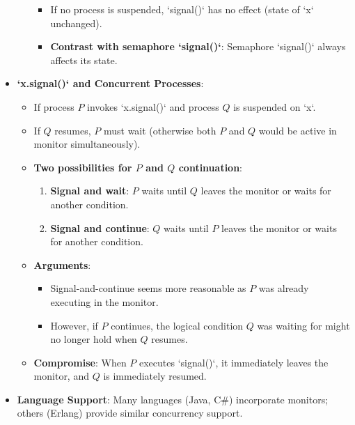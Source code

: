 \begin{itemize}
\begin{itemize}
\begin{itemize}
            \item If no process is suspended, `signal()` has no effect (state of `x` unchanged).
            \item \textbf{Contrast with semaphore `signal()`}: Semaphore `signal()` always affects its state.
        \end{itemize}
    \end{itemize}
    \item \textbf{`x.signal()` and Concurrent Processes}:
    \begin{itemize}
        \item If process $P$ invokes `x.signal()` and process $Q$ is suspended on `x`.
        \item If $Q$ resumes, $P$ must wait (otherwise both $P$ and $Q$ would be active in monitor simultaneously).
        \item \textbf{Two possibilities for $P$ and $Q$ continuation}:
        \begin{enumerate}
            \item \textbf{Signal and wait}: $P$ waits until $Q$ leaves the monitor or waits for another condition.
            \item \textbf{Signal and continue}: $Q$ waits until $P$ leaves the monitor or waits for another condition.
        \end{enumerate}
        \item \textbf{Arguments}:
        \begin{itemize}
            \item Signal-and-continue seems more reasonable as $P$ was already executing in the monitor.
            \item However, if $P$ continues, the logical condition $Q$ was waiting for might no longer hold when $Q$ resumes.
        \end{itemize}
        \item \textbf{Compromise}: When $P$ executes `signal()`, it immediately leaves the monitor, and $Q$ is immediately resumed.
    \end{itemize}
    \item \textbf{Language Support}: Many languages (Java, C\#) incorporate monitors; others (Erlang) provide similar concurrency support.


\end{itemize}
